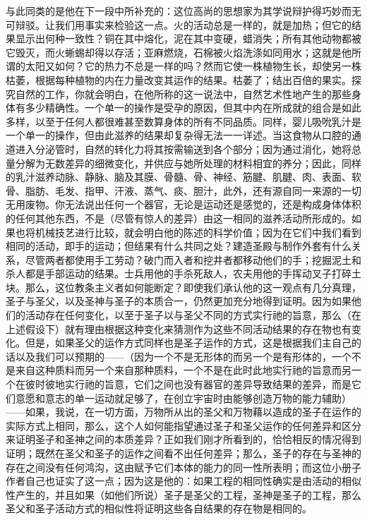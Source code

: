 与此同类的是他在下一段中所补充的：这位高尚的思想家为其学说辩护得巧妙而无可辩驳。让我们用事实来检验这一点。火的活动总是一样的，就是加热；但它的结果显示出何种一致性？铜在其中熔化，泥在其中变硬，蜡消失；所有其他动物都被它毁灭，而火蜥蜴却得以存活；亚麻燃烧，石棉被火焰洗涤如同用水；这就是他所谓的太阳又如何？它的热力不总是一样的吗？然而它使一株植物生长，却使另一株枯萎，根据每种植物的内在力量改变其运作的结果。枯萎了；结出百倍的果实。探究自然的工作，你就会明白，在他所称的这一说法中，自然艺术性地产生的那些身体有多少精确性。一个单一的操作是受孕的原因，但其中内在所成就的组合是如此多样，以至于任何人都很难甚至数算身体的所有不同品质。同样，婴儿吸吮乳汁是一个单一的操作，但由此滋养的结果却复杂得无法一一详述。当这食物从口腔的通道进入分泌管时，自然的转化力将其按需输送到各个部分；因为通过消化，她将总量分解为无数差异的细微变化，并供应与她所处理的材料相宜的养分；因此，同样的乳汁滋养动脉、静脉、脑及其膜、骨髓、骨、神经、筋腱、肌腱、肉、表面、软骨、脂肪、毛发、指甲、汗液、蒸气、痰、胆汁，此外，还有源自同一来源的一切无用废物。你无法说出任何一个器官，无论是运动还是感觉的，还是构成身体体积的任何其他东西，不是（尽管有惊人的差异）由这一相同的滋养活动所形成的。如果也将机械技艺进行比较，就会明白他的陈述的科学价值；因为在它们中我们看到相同的活动，即手的运动；但结果有什么共同之处？建造圣殿与制作外套有什么关系，尽管两者都使用手工劳动？破门而入者和挖井者都移动他们的手；挖掘泥土和杀人都是手部运动的结果。士兵用他的手杀死敌人，农夫用他的手挥动叉子打碎土块。那么，这位教条主义者如何能断定？即使我们承认他的这一观点有几分真理，圣子与圣父，以及圣神与圣子的本质合一，仍然更加充分地得到证明。因为如果他们的活动存在任何变化，以至于圣子以与圣父不同的方式实行祂的旨意，那么（在上述假设下）就有理由根据这种变化来猜测作为这些不同活动结果的存在物也有变化。但是，如果圣父的运作方式同样也是圣子运作的方式，这是根据我们主自己的话以及我们可以预期的——（因为一个不是无形体的而另一个是有形体的，一个不是来自这种质料而另一个来自那种质料，一个不是在此时此地实行祂的旨意而另一个在彼时彼地实行祂的旨意，它们之间也没有器官的差异导致结果的差异，而是它们意愿和意志的单一运动就足够了，在创立宇宙时由能够创造万物的能力辅助）——如果，我说，在一切方面，万物所从出的圣父和万物藉以造成的圣子在运作的实际方式上相同，那么，这个人如何能指望通过圣子和圣父运作的任何差异和区分来证明圣子和圣神之间的本质差异？正如我们刚才所看到的，恰恰相反的情况得到证明；既然在圣父和圣子的运作之间看不出任何差异；那么，圣子的存在与圣神的存在之间没有任何鸿沟，这由赋予它们本体的能力的同一性所表明；而这位小册子作者自己也证实了这一点；因为这是他的：如果工程的相同性确实是由活动的相似性产生的，并且如果（如他们所说）圣子是圣父的工程，圣神是圣子的工程，那么圣父和圣子活动方式的相似性将证明这些各自结果的存在物是相同的。\par

